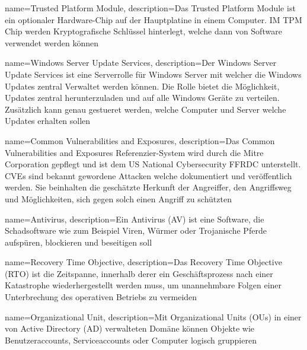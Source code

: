 {
    name=Trusted Platform Module,
    description={Das Trusted Platform Module ist ein optionaler Hardware-Chip auf der Hauptplatine in einem Computer. IM TPM Chip werden Kryptografische Schlüssel hinterlegt, welche dann von Software verwendet werden können}
}

{
    name=Windows Server Update Services,
    description={Der Windows Server Update Services ist eine Serverrolle für Windows Server mit welcher die Windows Updates zentral Verwaltet werden können. Die Rolle bietet die Möglichkeit, Updates zentral herunterzuladen und auf alle Windows Geräte zu verteilen. Zusätzlich kann genau gestueret werden, welche Computer und Server welche Updates erhalten sollen}
}

{
    name=Common Vulnerabilities and Exposures,
    description={Das Common Vulnerabilities and Exposures Referenzier-System wird durch die Mitre Corporation gepflegt und ist dem US National Cybersecurity FFRDC unterstellt. CVEs sind bekannt gewordene Attacken welche dokumentiert und veröffentlich werden. Sie beinhalten die geschätzte Herkunft der Angreiffer, den Angriffsweg und Möglichkeiten, sich gegen solch einen Angriff zu schützten}
}

{
    name=Antivirus,
    description={Ein Antivirus (AV) ist eine Software, die Schadsoftware wie zum Beispiel Viren, Würmer oder Trojanische Pferde aufspüren, blockieren und beseitigen soll}
}

{
    name=Recovery Time Objective,
    description={Das Recovery Time Objective (RTO) ist die Zeitspanne, innerhalb derer ein Geschäftsprozess nach einer Katastrophe wiederhergestellt werden muss, um unannehmbare Folgen einer Unterbrechung des operativen Betriebs zu vermeiden}
}

{
    name=Organizational Unit,
    description={Mit Organizational Units (OUs) in einer von Active Directory (AD) verwalteten Domäne können Objekte wie Benutzeraccounts, Serviceaccounts oder Computer logisch gruppieren}
}